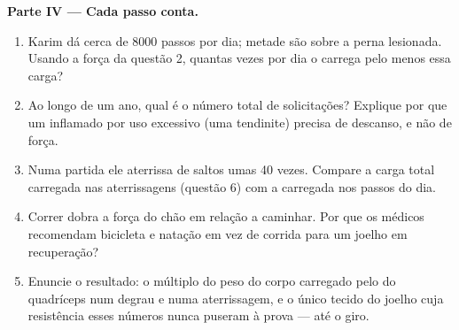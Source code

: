 \begin{problem}
\medskip
\noindent\textbf{Parte IV --- Cada passo conta.}
\begin{enumerate}[resume]
  \item Karim dá cerca de 8000 passos por dia; metade são sobre a perna
        lesionada. Usando a força da questão 2, quantas vezes por dia o
         carrega pelo menos essa carga?
  \item Ao longo de um ano, qual é o número total de solicitações?
        Explique por que um  inflamado por uso excessivo (uma
        tendinite) precisa de descanso, e não de força.
  \item Numa partida ele aterrissa de saltos umas 40 vezes. Compare a
        carga total carregada nas aterrissagens (questão 6) com a
        carregada nos passos do dia.
  \item Correr dobra a força do chão em relação a caminhar. Por que os
        médicos recomendam bicicleta e natação em vez de corrida para
        um joelho em recuperação?
  \item Enuncie o resultado: o múltiplo do peso do corpo carregado pelo
         do quadríceps num degrau e numa aterrissagem, e o único
        tecido do joelho cuja resistência esses números nunca puseram à
        prova --- até o giro.
\end{enumerate}
\end{problem}
